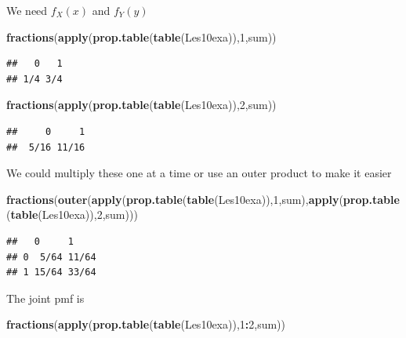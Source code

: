 \documentclass[]{book}
\newenvironment{Shaded}{\begin{snugshade}}{\end{snugshade}}
\newcommand{\KeywordTok}[1]{\textcolor[rgb]{0.13,0.29,0.53}{\textbf{#1}}}
\newcommand{\DecValTok}[1]{\textcolor[rgb]{0.00,0.00,0.81}{#1}}
\newcommand{\OperatorTok}[1]{\textcolor[rgb]{0.81,0.36,0.00}{\textbf{#1}}}
\newcommand{\NormalTok}[1]{#1}
\theoremstyle{definition}
\theoremstyle{definition}
\theoremstyle{definition}
\theoremstyle{remark}
\begin{document}
We need \(f_{X}(x)\) and \(f_{Y}(y)\)

\begin{Shaded}
\begin{Highlighting}[]
\KeywordTok{fractions}\NormalTok{(}\KeywordTok{apply}\NormalTok{(}\KeywordTok{prop.table}\NormalTok{(}\KeywordTok{table}\NormalTok{(Les10exa)),}\DecValTok{1}\NormalTok{,sum))}
\end{Highlighting}
\end{Shaded}

\begin{verbatim}
##   0   1 
## 1/4 3/4
\end{verbatim}

\begin{Shaded}
\begin{Highlighting}[]
\KeywordTok{fractions}\NormalTok{(}\KeywordTok{apply}\NormalTok{(}\KeywordTok{prop.table}\NormalTok{(}\KeywordTok{table}\NormalTok{(Les10exa)),}\DecValTok{2}\NormalTok{,sum))}
\end{Highlighting}
\end{Shaded}

\begin{verbatim}
##     0     1 
##  5/16 11/16
\end{verbatim}

We could multiply these one at a time or use an outer product to make it
easier

\begin{Shaded}
\begin{Highlighting}[]
\KeywordTok{fractions}\NormalTok{(}\KeywordTok{outer}\NormalTok{(}\KeywordTok{apply}\NormalTok{(}\KeywordTok{prop.table}\NormalTok{(}\KeywordTok{table}\NormalTok{(Les10exa)),}\DecValTok{1}\NormalTok{,sum),}\KeywordTok{apply}\NormalTok{(}\KeywordTok{prop.table}\NormalTok{(}\KeywordTok{table}\NormalTok{(Les10exa)),}\DecValTok{2}\NormalTok{,sum)))}
\end{Highlighting}
\end{Shaded}

\begin{verbatim}
##   0     1    
## 0  5/64 11/64
## 1 15/64 33/64
\end{verbatim}

The joint pmf is

\begin{Shaded}
\begin{Highlighting}[]
\KeywordTok{fractions}\NormalTok{(}\KeywordTok{apply}\NormalTok{(}\KeywordTok{prop.table}\NormalTok{(}\KeywordTok{table}\NormalTok{(Les10exa)),}\DecValTok{1}\OperatorTok{:}\DecValTok{2}\NormalTok{,sum))}
\end{Highlighting}
\end{Shaded}
\end{document}

